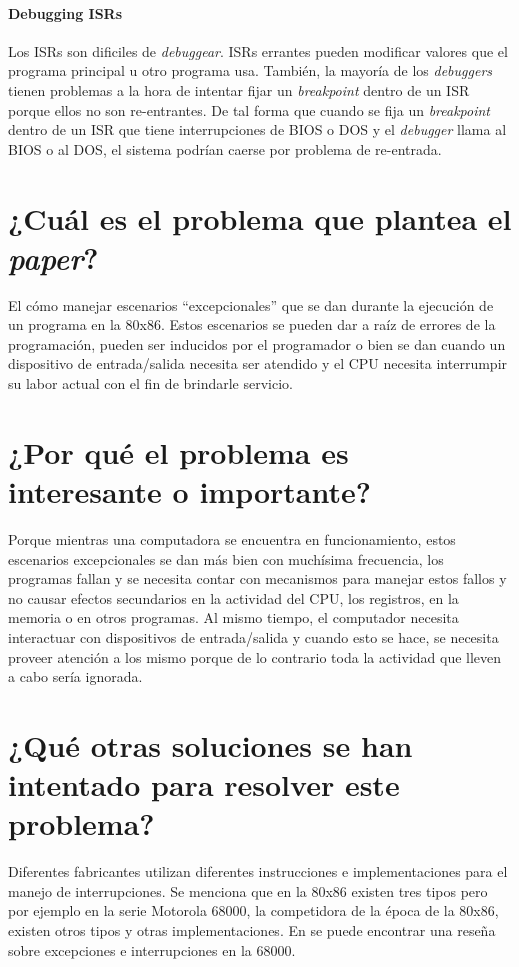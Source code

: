 \paragraph{Debugging ISRs}
Los ISRs son dificiles de \textit{debuggear}. ISRs errantes pueden modificar valores que el programa principal u otro programa usa. También, la mayoría de los \textit{debuggers} tienen problemas a la hora de intentar fijar un \textit{breakpoint} dentro de un ISR porque ellos no son re-entrantes. De tal forma que cuando se fija un \textit{breakpoint} dentro de un ISR que tiene interrupciones de BIOS o DOS y el \textit{debugger} llama al BIOS o al DOS, el sistema podrían caerse por problema de re-entrada.

\section{¿Cuál es el problema que plantea el \textit{paper}?}
El cómo manejar escenarios ``excepcionales'' que se dan durante la ejecución de un programa en la 80x86. Estos escenarios se pueden dar a raíz de errores de la programación, pueden ser inducidos por el programador o bien se dan cuando un dispositivo de entrada/salida necesita ser atendido y el CPU necesita interrumpir su labor actual con el fin de brindarle servicio.

\section{¿Por qué el problema es interesante o importante?}
Porque mientras una computadora se encuentra en funcionamiento, estos escenarios excepcionales se dan más bien con muchísima frecuencia, los programas fallan y se necesita contar con mecanismos para manejar estos fallos y no causar efectos secundarios en la actividad del CPU, los registros, en la memoria o en otros programas. Al mismo tiempo, el computador necesita interactuar con dispositivos de entrada/salida y cuando esto se hace, se necesita proveer atención a los mismo porque de lo contrario toda la actividad que lleven a cabo sería ignorada.  

\section{¿Qué otras soluciones se han intentado para resolver este problema?}
Diferentes fabricantes utilizan diferentes instrucciones e implementaciones para el manejo de interrupciones. Se menciona que en la 80x86 existen tres tipos pero por ejemplo en la serie Motorola 68000, la competidora de la época de la 80x86, existen otros tipos y otras implementaciones. En \cite{antic} se puede encontrar una reseña sobre excepciones e interrupciones en la 68000.

